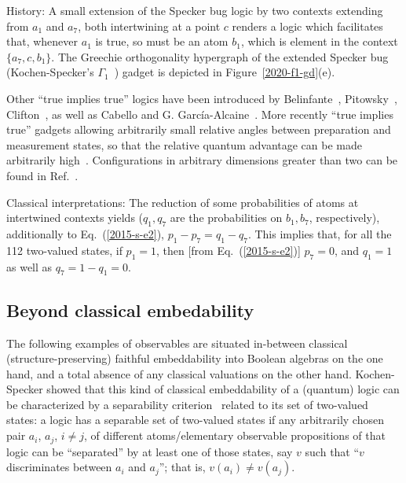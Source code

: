 History:
A small extension of the Specker bug logic by two contexts extending from $a_1$ and $a_7$,
both intertwining at a point $c$ renders a logic which facilitates that,
whenever $a_1$ is true, so must be an atom $b_1$, which is element in the context $\{a_7,c,b_1\}$.
The Greechie orthogonality hypergraph of the extended Specker bug (Kochen-Specker's $\Gamma_1$~\cite[p.~68]{kochen1})
gadget is depicted in Figure~\ref{2020-f1-gd}(e).


Other ``true implies true'' logics have been introduced by Belinfante~\cite[Figure~C.l. p.~67]{Belinfante-73},
Pitowsky~\cite[p.~394]{Pitowsky-1982-subs},
Clifton~\cite{clifton-93,Johansen-1994,Vermaas-1994},
as well as Cabello and G. Garc{\'{i}}a-Alcaine~\cite[Lemma~1]{Cabello-1996-bks-fd}.
More recently ``true implies true'' gadgets
allowing arbitrarily small relative angles between preparation and measurement states,
so that the relative quantum advantage
can be made arbitrarily high~\cite{2015-AnalyticKS,svozil-2018-whycontexts}.
Configurations in arbitrary dimensions greater than two can be found in Ref.~\cite{2018-minimalYIYS}.

Classical interpretations:
The reduction of some probabilities of atoms at intertwined contexts yields
($q_1, q_7$ are the probabilities on $b_1, b_7$, respectively),
additionally to Eq.~(\ref{2015-s-e2}),
$
p_1 - p_7 = q_1 - q_7
$.
This implies that, for all the 112 two-valued states, if $p_1=1$, then [from Eq.~(\ref{2015-s-e2})] $p_7=0$,
and $q_1=1$ as well as $q_7 = 1 - q_1 = 0$.


\subsection{Beyond classical embedability}

The following examples of observables are situated in-between classical (structure-preserving) faithful embeddability into
Boolean algebras on the one hand, and a total absence of any classical valuations on the other hand.
Kochen-Specker showed that this kind of classical embeddability of a (quantum) logic  can be characterized by a
separability criterion~\cite[Theorem~0]{kochen1} related to its set of two-valued states:
a logic has a separable set of two-valued states if any arbitrarily chosen pair $a_i$, $a_j$, $i\neq j$,
of different atoms/elementary observable propositions of that logic  can be ``separated''
by at least one of those states, say $v$ such that ``$v$ discriminates between $a_i$ and $a_j$'';
that is, $v(a_i)  \neq v(a_j)$.


